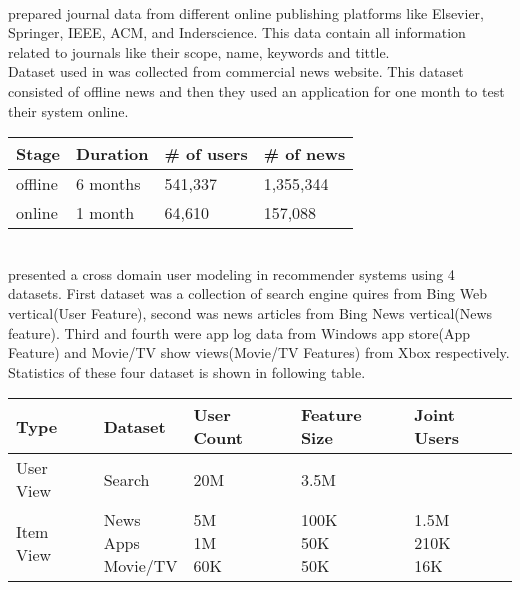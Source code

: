 \\
\cite{N22}  prepared journal data from different online publishing platforms like Elsevier, Springer, IEEE, ACM, and Inderscience. This data contain all information related to journals like their scope, name, keywords and tittle.
\\
Dataset used in \cite{N67} was collected from commercial news website. This dataset consisted of offline news and then they used an application for one month to test their system online. 
\\
\begin{table}[!htbp] 
\centering
\footnotesize
\def\arraystretch{1.4}%
\centering
\begin{tabular}{|p{3cm}|p{3cm}|p{3cm}|p{3cm}|}
\hline
  Stage & Duration & \# of users & \# of news
\\
\hline 
offline & 6 months & 541,337 & 1,355,344
\\
\hline 
online & 1 month & 64,610 & 157,088
\\
\hline
\end{tabular}

\end{table}
\\

\cite{N64} presented a cross domain user modeling in recommender systems using 4 datasets. First dataset was a collection of search engine quires from Bing Web vertical(User Feature), second was news articles from Bing News vertical(News feature). Third and fourth were app log data from Windows app store(App Feature) and Movie/TV show views(Movie/TV Features) from Xbox respectively. 
Statistics of these four dataset is shown in following table.
\\
\begin{table}[!htbp] 
\centering
\footnotesize
\def\arraystretch{1.4}%
\centering
\begin{tabular}{|p{3cm}|p{3cm}|p{1.5cm}|p{1.5cm}|p{2cm}|}
\hline 
Type& Dataset & User Count & Feature Size & Joint Users
\\
\hline 
User View & Search & 20M & 3.5M & 
\\
\hline 
Item View & \makecell{News \\ Apps \\ Movie/TV}  & \makecell{5M \\ 1M \\ 60K} & \makecell{100K \\ 50K \\ 50K} & \makecell{1.5M \\ 210K \\ 16K}
\\
\hline
\end{tabular}

\end{table}
\\

